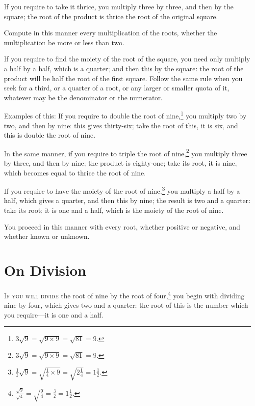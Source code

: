 If you require to take it thrice, you multiply three by three, and then by the square; the root of the product is thrice the root of the original square.

Compute in this manner every multiplication of the roots, whether the multiplication be more or less than two.

If you require to find the moiety of the root of the square, you need only multiply a half by a half, which is a quarter; and then this by the square: the root of the product will be half the root of the first square. Follow the same rule when you seek for a third, or a quarter of a root, or any larger or smaller quota of it, whatever may be the denominator or the numerator.

Examples of this: If you require to double the root of nine,\footnote{$3\sqrt{9} = \sqrt{9 \times 9} = \sqrt{81} = 9$.} you multiply two by two, and then by nine: this gives thirty-six; take the root of this, it is six, and this is double the root of nine.

In the same manner, if you require to triple the root of nine,\footnote{$3\sqrt{9} = \sqrt{9 \times 9} = \sqrt{81} = 9$.} you multiply three by three, and then by nine; the product is eighty-one; take its root, it is nine, which becomes equal to thrice the root of nine.

If you require to have the moiety of the root of nine,\footnote{$\frac{1}{2}\sqrt{9} = \sqrt{\frac{1}{4} \times 9} = \sqrt{2\frac{1}{4}} = 1\frac{1}{2}$.} you multiply a half by a half, which gives a quarter, and then this by nine; the result is two and a quarter: take its root; it is one and a half, which is the moiety of the root of nine.

You proceed in this manner with every root, whether positive or negative, and whether known or unknown.

\clearpage

\section*{On Division}

\lettrine{I}{f you will divide} the root of nine by the root of four,\footnote{$\frac{\sqrt{9}}{\sqrt{4}} = \sqrt{\frac{9}{4}} = \frac{3}{2} = 1\frac{1}{2}$.} you begin with dividing nine by four, which gives two and a quarter: the root of this is the number which you require---it is one and a half.


